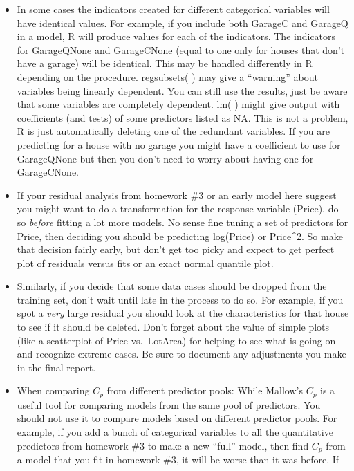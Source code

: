 \documentclass[
]{article}
\begin{document}
\begin{itemize}
\item
  In some cases the indicators created for different categorical
  variables will have identical values. For example, if you include both
  GarageC and GarageQ in a model, R will produce values for each of the
  indicators. The indicators for GarageQNone and GarageCNone (equal to
  one only for houses that don't have a garage) will be identical. This
  may be handled differently in R depending on the procedure.
  regsubsets( ) may give a ``warning'' about variables being linearly
  dependent. You can still use the results, just be aware that some
  variables are completely dependent. lm( ) might give output with
  coefficients (and tests) of some predictors listed as NA. This is not
  a problem, R is just automatically deleting one of the redundant
  variables. If you are predicting for a house with no garage you might
  have a coefficient to use for GarageQNone but then you don't need to
  worry about having one for GarageCNone.
\item
  If your residual analysis from homework \#3 or an early model here
  suggest you might want to do a transformation for the response
  variable (Price), do so \emph{before} fitting a lot more models. No
  sense fine tuning a set of predictors for Price, then deciding you
  should be predicting log(Price) or Price\^{}2. So make that decision
  fairly early, but don't get too picky and expect to get perfect plot
  of residuals versus fits or an exact normal quantile plot.
\item
  Similarly, if you decide that some data cases should be dropped from
  the training set, don't wait until late in the process to do so. For
  example, if you spot a \emph{very} large residual you should look at
  the characteristics for that house to see if it should be deleted.
  Don't forget about the value of simple plots (like a scatterplot of
  Price vs.~LotArea) for helping to see what is going on and recognize
  extreme cases. Be sure to document any adjustments you make in the
  final report.
\item
  When comparing \(C_{p}\) from different predictor pools: While
  Mallow's \(C_{p}\) is a useful tool for comparing models from the same
  pool of predictors. You should not use it to compare models based on
  different predictor pools. For example, if you add a bunch of
  categorical variables to all the quantitative predictors from homework
  \#3 to make a new ``full'' model, then find \(C_{p}\) from a model
  that you fit in homework \#3, it will be worse than it was before. If

\end{itemize}
\end{document}
